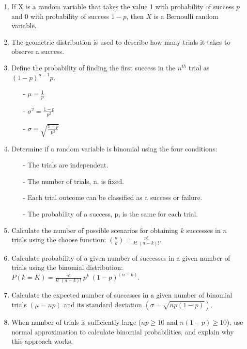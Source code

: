 \documentclass[11pt]{article}
\begin{document}
%

\vspace{0.48cm}

%

\begin{enumerate}[resume]
\renewcommand\labelenumi{\textcolor{oiB}{\textbf{LO \theenumi.}}}

\item If X is a random variable that takes the value 1 with probability of success $p$ and 0 with probability of success $1-p$, then $X$ is a Bernoulli random variable.

\item The geometric distribution is used to describe how many trials it takes to observe a success.

\item Define the probability of finding the first success in the $n^{th}$ trial as $(1-p)^{n-1}p$.
\begin{itemize}
\item[-] $\mu = \frac{1}{p}$
\item[-] $\sigma^2 = \frac{1-p}{p^2}$
\item[-] $\sigma = \sqrt{\frac{1-p}{p^2}}$
\end{itemize}

\item Determine if a random variable is binomial using the four conditions:
\begin{itemize}
\item[-] The trials are independent. 
\item[-] The number of trials, n, is fixed. 
\item[-] Each trial outcome can be classified as a success or failure. 
\item[-] The probability of a success, p, is the same for each trial. 
\end{itemize}

\item Calculate the number of possible scenarios for obtaining $k$ successes in $n$ trials using the choose function: ${n \choose k} = \frac{n!}{k!~(n - k)!}$.

\item Calculate probability of a given number of successes in a given number of trials using the binomial distribution: $P(k = K) = \frac{n!}{k!~(n - k)!}~p^k~(1-p)^{(n - k)}$. 

\item Calculate the expected number of successes in a given number of binomial trials $(\mu = np)$ and its standard deviation $(\sigma = \sqrt{np(1-p)})$.

\item When number of trials is sufficiently large ($np \ge 10$ and $n(1-p) \ge 10$), use normal approximation to calculate binomial probabilities, and explain why this approach works.

\end{enumerate}
\end{document}
